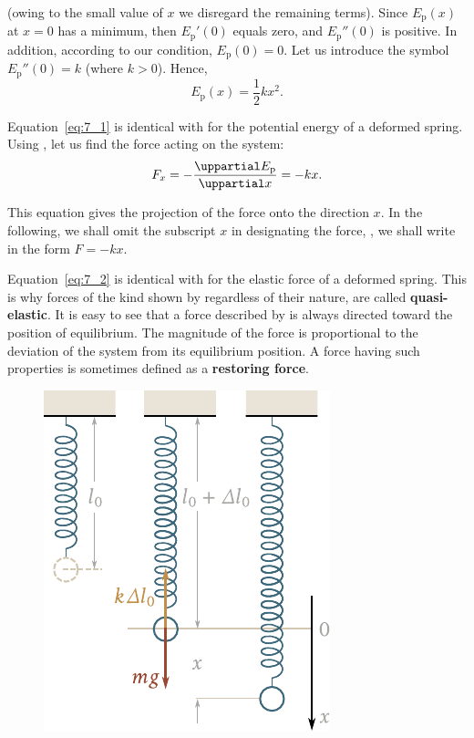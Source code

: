 \noindent
(owing to the small value of $x$ we disregard the remaining terms). Since $E_{\text{p}}(x)$ at $x=0$ has a minimum, then $E_{\text{p}}'(0)$ equals zero, and $E_{\text{p}}''(0)$ is positive. In addition, according to our condition, $E_{\text{p}}(0)=0$. Let us introduce the symbol $E_{\text{p}}''(0)=k$ (where $k>0$). Hence,
\begin{equation}\label{eq:7_1}
	E_{\text{p}}(x) = \frac{1}{2}kx^2.
\end{equation}

Equation~\eqref{eq:7_1} is identical with  for the potential energy of a deformed spring. Using , let us find the force acting on the system:
\begin{equation}\label{eq:7_2}
	F_x = -\diffpartial{E_{\text{p}}}{x} = -kx.
\end{equation}

This equation gives the projection of the force onto the direction $x$. In the following, we shall omit the subscript $x$ in designating the force, \ie, we shall write  in the form $F=-kx$.

Equation~\eqref{eq:7_2} is identical with  for the elastic force of a deformed spring. This is why forces of the kind shown by  regardless of their nature, are called \textbf{quasi-elastic}. It is easy to see that a force described by  is always directed toward the position of equilibrium. The magnitude of the force is proportional to the deviation of the system from its equilibrium position. A force having such properties is sometimes defined as a \textbf{restoring force}.

\begin{figure}[t]
	\begin{center}
		\includegraphics[scale=0.95]{figures/ch_07/fig_7_1.pdf}
		\caption[]{}
		\label{fig:7_1}
	\end{center}
	\vspace{-0.7cm}
\end{figure}

